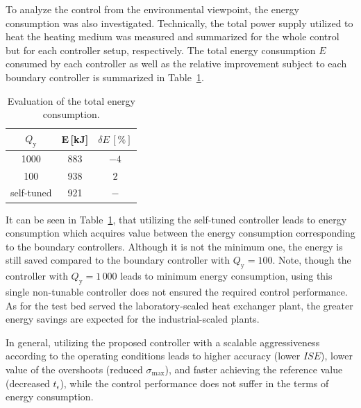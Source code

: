 \documentclass[preprint,12pt]{elsarticle}
\begin{document}
	To analyze the control from the environmental viewpoint, the energy consumption was also investigated. Technically, the total power supply utilized to heat the heating medium was measured and summarized for the whole control but for each controller setup, respectively. The total energy consumption $E$ consumed by each controller as well as the relative improvement subject to each boundary controller is summarized in Table~\ref{tab:energy}.
	
	\begin{table}[h!]
		\begin{center}
			\caption{Evaluation of the total energy consumption.}
			\label{tab:energy}
			\begin{tabular}{c|c|c} 
				$Q_\mathrm{y}$ & E\,[kJ] & $\delta E\,[\%]$   \\
				\hline
				1000 &  883 & $-4$\\ 
				100 & 938 & $2$ \\ 
				self-tuned & 921 & $-$
			\end{tabular}
		\end{center}
	\end{table}
	
	It can be seen in Table~\ref{tab:energy}, that utilizing the self-tuned controller leads to energy consumption which acquires value between the energy consumption corresponding to the boundary controllers. Although it is not the minimum one, the energy is still saved compared to the boundary controller with $Q_\mathrm{y} = 100$. Note, though the controller with $Q_\mathrm{y} = 1\,000$ leads to minimum energy consumption, using this single non-tunable controller does not ensured the required control performance. As for the test bed served the laboratory-scaled heat exchanger plant, the greater energy savings are expected for the industrial-scaled plants. 
	
	In general, utilizing the proposed controller with a scalable aggressiveness according to the operating conditions leads to higher accuracy (lower $ISE$), lower value of the overshoots (reduced $\sigma_{\mathrm{max}}$), and faster achieving the reference value (decreased $t_{\epsilon}$), while the control performance does not suffer in the terms of energy consumption. 
	
	
\end{document}
